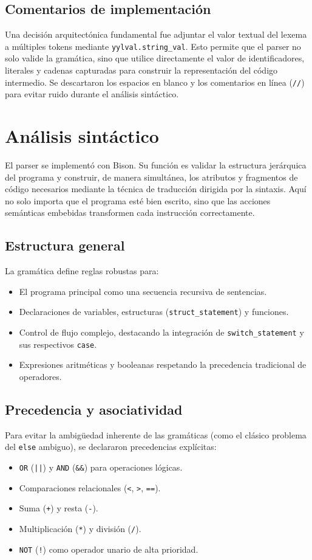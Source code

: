 \documentclass[12pt]{article}
\begin{document}
\subsection{Comentarios de implementación}
Una decisión arquitectónica fundamental fue adjuntar el valor textual del lexema a múltiples tokens mediante \texttt{yylval.string\_val}. Esto permite que el parser no solo valide la gramática, sino que utilice directamente el valor de identificadores, literales y cadenas capturadas para construir la representación del código intermedio. Se descartaron los espacios en blanco y los comentarios en línea (\texttt{//}) para evitar ruido durante el análisis sintáctico.

\section{Análisis sintáctico}
El parser se implementó con Bison. Su función es validar la estructura jerárquica del programa y construir, de manera simultánea, los atributos y fragmentos de código necesarios mediante la técnica de traducción dirigida por la sintaxis. Aquí no solo importa que el programa esté bien escrito, sino que las acciones semánticas embebidas transformen cada instrucción correctamente.

\subsection{Estructura general}
La gramática define reglas robustas para:
\begin{itemize}[label={-}]
    \item El programa principal como una secuencia recursiva de sentencias.
    \item Declaraciones de variables, estructuras (\texttt{struct\_statement}) y funciones.
    \item Control de flujo complejo, destacando la integración de \texttt{switch\_statement} y sus respectivos \texttt{case}.
    \item Expresiones aritméticas y booleanas respetando la precedencia tradicional de operadores.
\end{itemize}

\subsection{Precedencia y asociatividad}
Para evitar la ambigüedad inherente de las gramáticas (como el clásico problema del \texttt{else} ambiguo), se declararon precedencias explícitas:
\begin{itemize}[label={-}]
    \item \texttt{OR} (\texttt{||}) y \texttt{AND} (\texttt{\&\&}) para operaciones lógicas.
    \item Comparaciones relacionales (\texttt{<}, \texttt{>}, \texttt{==}).
    \item Suma (\texttt{+}) y resta (\texttt{-}).
    \item Multiplicación (\texttt{*}) y división (\texttt{/}).
    \item \texttt{NOT} (\texttt{!}) como operador unario de alta prioridad.
\end{itemize}
\end{document}

